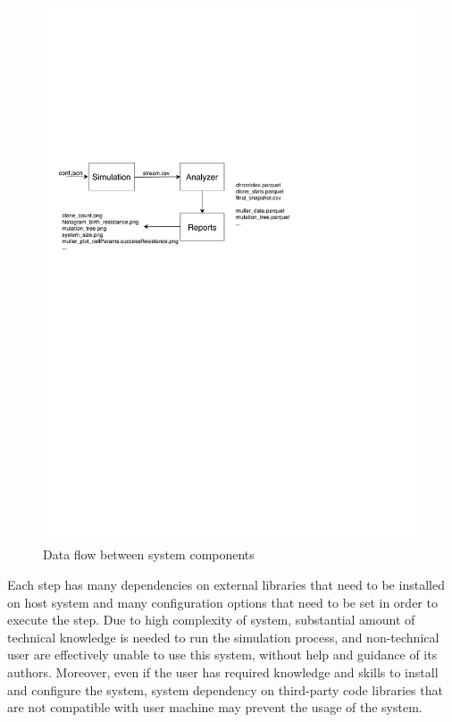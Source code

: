 \begin{figure}[ht]
	\centering
		\includegraphics[width=0.9\linewidth]{diagrams/simbad-data-flow.pdf}
	\caption{Data flow between system components}
	\label{fig:data-flow}
\end{figure}

Each step has many dependencies on external libraries that need to be installed on host system and many configuration options that need to be set in order to execute the step. Due to high complexity of system, substantial amount of technical knowledge is needed to run the simulation process, and non-technical user are effectively unable to use this system, without help and guidance of its authors. Moreover, even if the user has required knowledge and skills to install and configure the system, system dependency on third-party code libraries that are not compatible with user machine may prevent the usage of the system.

